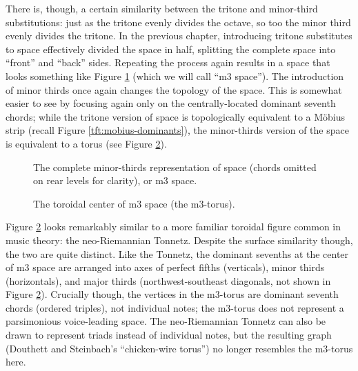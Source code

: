 There is, though, a certain similarity between the tritone and minor-third
substitutions: just as the tritone evenly divides the octave, so too the minor
third evenly divides the tritone. In the previous chapter, introducing tritone
substitutes to \tf space effectively divided the space in half, splitting the
complete space into ``front'' and ``back'' sides. Repeating the process again
results in a space that looks something like Figure \ref{mts:m3-space} (which
we will call ``m3 space''). The introduction of minor thirds once again
changes the topology of the space. This is somewhat easier to see by focusing
again only on the centrally-located dominant seventh chords; while the tritone
version of \tf space is topologically equivalent to a Möbius strip (recall
Figure \ref{tft:mobius-dominants}), the minor-thirds version of the space is
equivalent to a torus (see Figure \ref{mts:m3-torus}).

\begin{figure}[tbp]
  \caption[The complete minor-thirds representation of \tf space (m3 space).]{The
    complete minor-thirds representation of \tf space (\ii chords omitted on
    rear levels for clarity), or m3 space.}
  \label{mts:m3-space}
\end{figure}


\begin{figure}[tbp]
  \caption{The toroidal center of m3 space (the m3-torus).}
  \label{mts:m3-torus}
\end{figure}

Figure \ref{mts:m3-torus} looks remarkably similar to a more familiar toroidal
figure common in music theory: the neo-Riemannian Tonnetz. Despite the surface
similarity though, the two are quite distinct. Like the Tonnetz, the dominant
sevenths at the center of m3 space are arranged into axes of perfect fifths
(verticals), minor thirds (horizontals), and major thirds (northwest-southeast
diagonals, not shown in Figure \ref{mts:m3-torus}). Crucially though, the
vertices in the m3-torus are dominant seventh chords (ordered triples), not
individual notes; the m3-torus does not represent a parsimonious voice-leading
space. The neo-Riemannian Tonnetz can also be drawn to represent triads instead of
individual notes, but the resulting graph (Douthett and Steinbach's
``chicken-wire torus'') no longer resembles the m3-torus here.

